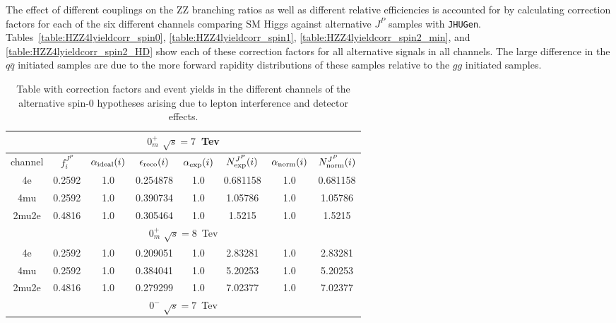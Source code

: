 The effect of different couplings on the ZZ branching 
ratios as well as different relative efficiencies is accounted
for by calculating correction factors for each of the six different 
channels comparing SM Higgs against alternative $J^P$ samples 
with \verb+JHUGen+.  Tables~\ref{table:HZZ4lyieldcorr_spin0},
\ref{table:HZZ4lyieldcorr_spin1},
\ref{table:HZZ4lyieldcorr_spin2_min},
and \ref{table:HZZ4lyieldcorr_spin2_HD} show
 each of these correction
factors for all alternative signals in all channels.  The large
difference in the $q\bar{q}$ initiated samples are due to the
more forward rapidity distributions of these samples relative to 
the $gg$ initiated samples.  

\begin{table}[b]
\centering
\caption{
Table with correction factors and event yields in the different
channels of the alternative spin-0 hypotheses arising
due to lepton interference and detector effects.}
\centering %
\begin{tabular}{c c c c c c c c} %
\hline \hline

 \multicolumn{8}{|c|}{$0^{+}_{m}$ $\sqrt{s}=7$~Tev} \\ \hline 

channel & $f_{i}^{J^P}$ & $\alpha_{\rm ideal} (i)$ & $\epsilon_{\rm reco} (i)$ & $\alpha_{\rm exp} (i)$ & $N^{J^P}_{\rm exp} (i)$ & $\alpha_{\rm norm} (i)$ & $N^{J^P}_{\rm norm} (i)$\\ \hline 
4e & 0.2592 &  1.0  & 0.254878 &  1.0  & 0.681158 &  1.0  & 0.681158 \\ \hline 
4mu & 0.2592 &  1.0  & 0.390734 &  1.0  & 1.05786 &  1.0  & 1.05786 \\ \hline 
2mu2e & 0.4816 &  1.0  & 0.305464 &  1.0  & 1.5215 &  1.0  & 1.5215 \\ \hline \hline 

 \multicolumn{8}{|c|}{$0^{+}_{m}$ $\sqrt{s}=8$~Tev} \\ \hline 

4e & 0.2592 &  1.0  & 0.209051 &  1.0  & 2.83281 &  1.0  & 2.83281 \\ \hline 
4mu & 0.2592 &  1.0  & 0.384041 &  1.0  & 5.20253 &  1.0  & 5.20253 \\ \hline 
2mu2e & 0.4816 &  1.0  & 0.279299 &  1.0  & 7.02377 &  1.0  & 7.02377 \\ \hline \hline  

\multicolumn{8}{|c|}{$0^{-}$ $\sqrt{s}=7$~Tev} \\ \hline


\end{tabular}
\end{table}
